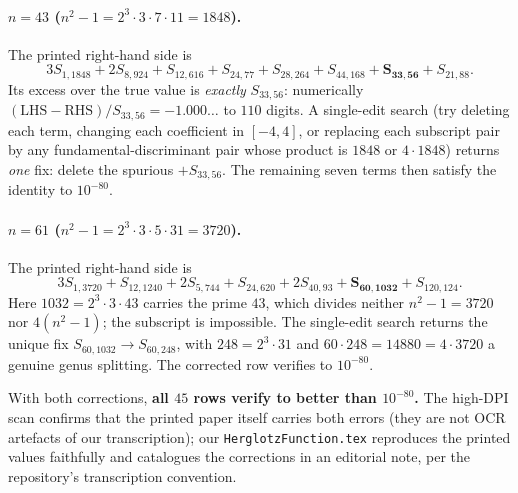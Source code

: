 \documentclass[11pt]{article}
\theoremstyle{plain}\newtheorem{theorem}{Theorem}\newtheorem{proposition}[theorem]{Proposition}
\theoremstyle{remark}\newtheorem{remark}[theorem]{Remark}
\begin{document}
\paragraph{$n=43$ ($n^2-1=2^3\cdot3\cdot7\cdot11=1848$).}
The printed right-hand side is
\[
  3S_{1,1848}+2S_{8,924}+S_{12,616}+S_{24,77}+S_{28,264}+S_{44,168}+\mathbf{S_{33,56}}+S_{21,88}.
\]
Its excess over the true value is \emph{exactly} $S_{33,56}$: numerically
$(\text{LHS}-\text{RHS})/S_{33,56}=-1.000\ldots$ to $110$ digits. A single-edit search (try deleting each
term, changing each coefficient in $[-4,4]$, or replacing each subscript pair by any
fundamental-discriminant pair whose product is $1848$ or $4\cdot1848$) returns \emph{one} fix: delete the
spurious $+S_{33,56}$. The remaining seven terms then satisfy the identity to $10^{-80}$.

\paragraph{$n=61$ ($n^2-1=2^3\cdot3\cdot5\cdot31=3720$).}
The printed right-hand side is
\[
  3S_{1,3720}+S_{12,1240}+2S_{5,744}+S_{24,620}+2S_{40,93}+\mathbf{S_{60,1032}}+S_{120,124}.
\]
Here $1032=2^3\cdot3\cdot43$ carries the prime $43$, which divides neither $n^2-1=3720$ nor $4(n^2-1)$;
the subscript is impossible. The single-edit search returns the unique fix
$S_{60,1032}\rightarrow S_{60,248}$, with $248=2^3\cdot31$ and $60\cdot248=14880=4\cdot3720$ a genuine
genus splitting. The corrected row verifies to $10^{-80}$.

\medskip
\noindent With both corrections, \textbf{all $45$ rows verify to better than $10^{-80}$.} The high-DPI
scan confirms that the printed paper itself carries both errors (they are not OCR artefacts of our
transcription); our \texttt{HerglotzFunction.tex} reproduces the printed values faithfully and catalogues
the corrections in an editorial note, per the repository's transcription convention.
\end{document}
